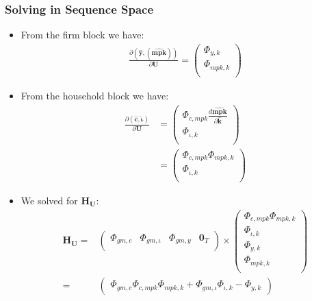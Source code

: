 \documentclass[english,xcolor=svgnames]{beamer}
\begin{document}
	
	
	
	\begin{frame}
		\frametitle{Solving in Sequence Space}
			\begin{itemize}
				\item From the firm block we have:
				\begin{align*}
					\frac{\partial (\mathbf{\hat{y}},\mathbf{(\hat{mpk})})}{\partial \mathbf{U}} = \begin{pmatrix}
						\Phi_{y,k} \\
						\Phi_{mpk,k} \\
					\end{pmatrix}
				\end{align*}
				\item From the household block we have:
				\begin{align*}
					\frac{\partial \mathbf{(\hat{c},\hat{\iota})}}{\partial \mathbf{U}} &= \begin{pmatrix}
						\Phi_{c,mpk}\frac{d\mathbf{\hat{mpk}}}{\partial \mathbf{\hat{k}} } \\
						\Phi_{\iota,k} \\
					\end{pmatrix} \\
					&= \begin{pmatrix}
						\Phi_{c,mpk}\Phi_{mpk,k} \\
						\Phi_{\iota,k} \\
					\end{pmatrix}
				\end{align*}
				\item We solved for $\mathbf{H}_{\mathbf{U}}$:
				\begin{align*}
					\mathbf{H}_{\mathbf{U}} =&\begin{pmatrix}
						\Phi_{gm,c} & \Phi_{gm,\iota} & \Phi_{gm,y}  & \mathbf{0}_T   \\ 
					\end{pmatrix} \times  \begin{pmatrix}
						\Phi_{c,mpk}\Phi_{mpk,k} \\
						\Phi_{\iota,k} \\
						\Phi_{y,k} \\
						\Phi_{mpk,k} \\
					\end{pmatrix} \\
					= &\begin{pmatrix}
						\Phi_{gm,c}\Phi_{c,mpk}\Phi_{mpk,k} + \Phi_{gm,\iota}\Phi_{\iota,k} - \Phi_{y,k} 
					\end{pmatrix} 
				\end{align*}
			\end{itemize}
	\end{frame}
	
\end{document}
